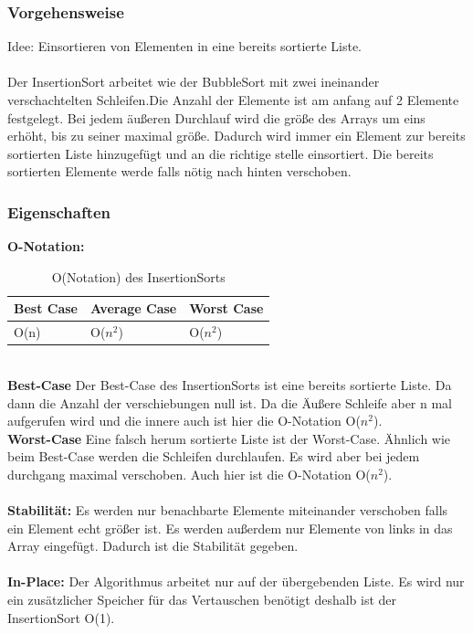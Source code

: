 \documentclass{article}
\begin{document}
\subsubsection{Vorgehensweise}
Idee: Einsortieren von Elementen in eine bereits sortierte Liste. \\ \\
Der InsertionSort arbeitet wie der BubbleSort mit zwei ineinander verschachtelten Schleifen.Die Anzahl der Elemente ist am anfang auf 2 Elemente festgelegt. Bei jedem äußeren Durchlauf wird die größe des Arrays um eins erhöht, bis zu seiner maximal größe. Dadurch wird immer ein Element zur bereits sortierten Liste hinzugefügt und an die richtige stelle einsortiert. Die bereits sortierten Elemente werde falls nötig nach hinten verschoben.

\subsubsection{Eigenschaften}
\textbf{O-Notation:}
\begin{table}[h]
\centering
\begin{tabular}{lll}
	\hline
	\textbf{Best Case} & \textbf{Average Case} & \textbf{Worst Case} \\
	\hline
	O(n) & O($n^{2}$) & O($n^{2}$) \\
	\hline
\end{tabular}
\caption{O(Notation) des InsertionSorts \cite{India2015Dataset}}
\label{tab:InsertionSort}
\end{table}
\\
\textbf{Best-Case} Der Best-Case des InsertionSorts ist eine bereits sortierte Liste. Da dann die Anzahl der verschiebungen null ist. Da die Äußere Schleife aber n mal aufgerufen wird und die innere auch ist hier die O-Notation O($n^{2}$). \\
\textbf{Worst-Case} Eine falsch herum sortierte Liste ist der Worst-Case. Ähnlich wie beim Best-Case werden die Schleifen durchlaufen. Es wird aber bei jedem durchgang maximal verschoben. Auch hier ist die O-Notation O($n^{2}$).\\ \\
\textbf{Stabilität:}  Es werden nur benachbarte Elemente miteinander verschoben falls ein Element echt größer ist. Es werden außerdem nur Elemente von links in das Array eingefügt. Dadurch ist die Stabilität gegeben.\\ \\
\textbf{In-Place:}  Der Algorithmus arbeitet nur auf der übergebenden Liste. Es wird nur ein zusätzlicher Speicher für das Vertauschen benötigt deshalb ist der InsertionSort O(1).\\
\end{document}
